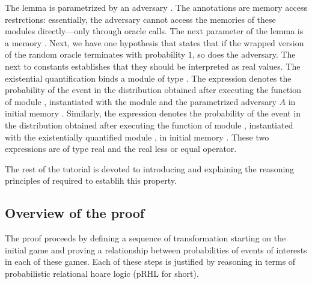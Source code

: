 The lemma  is parametrized by an adversary . The
annotations  are memory access restrctions:
essentially, the adversary cannot access the memories of these modules
directly---only through oracle calls. The next parameter of the lemma
is a memory . Next, we have one hypothesis that states that if
the wrapped version of the random oracle terminates with probability
$1$, so does the adversary. The  next to constants establishes
that they should be interpreted as real values. The existential
quantification binds a module  of type . The
expression  denotes the
probability of the event  in the distribution obtained after
executing the  function of module , instantiated with
the module  and the parametrized adversary $A$ in initial
memory . Similarly, the expression  denotes the probability of the event  in the
distribution obtained after executing the  function of module
, instantiated with the existentially quantified module ,
in initial memory . These two expressions are of type real and
the \ec{<=} real less or equal operator.

The rest of the tutorial is devoted to introducing and explaining the
reasoning principles of \EasyCrypt required to establih this property.

\subsection{Overview of the proof}
The proof proceeds by defining a sequence of transformation starting
on the initial game and proving a relationship between probabilities
of events of interests in each of these games. Each of these steps is
justified by reasoning in terms of probabilistic relational hoare
logic (pRHL for short).

